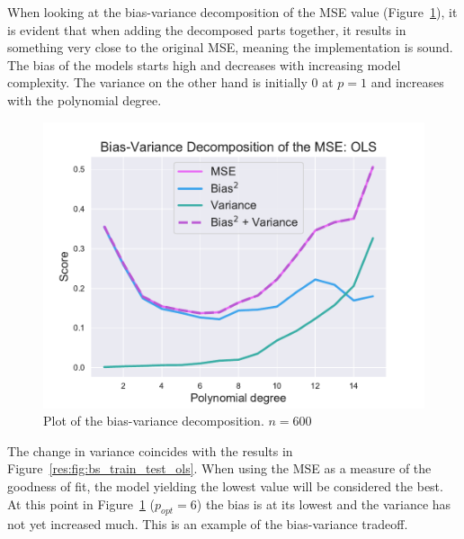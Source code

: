 \documentclass[twocolumn,english,notitlepage]{article}
\begin{document}
            When looking at the bias-variance decomposition of the MSE value (Figure~\ref{res:fig:bs_OLS_bias_variance_tradeoff_ols}), it is evident that when adding the decomposed parts together, it results in something very close to the original MSE, meaning the implementation is sound. The bias of the models starts high and decreases with increasing model complexity. The variance on the other hand is initially $0$ at $p=1$ and increases with the polynomial degree. 
            \begin{figure}[ht]
                \centering
                \includegraphics[width=.9\linewidth]{BS_Bias_var_decomp_OLS.pdf}
                \caption{Plot of the bias-variance decomposition. $n=600$ }
                \label{res:fig:bs_OLS_bias_variance_tradeoff_ols}
            \end{figure}

            The change in variance coincides with the results in Figure~\ref{res:fig:bs_train_test_ols}.
            When using the MSE as a measure of the goodness of fit, the model yielding the lowest value will be considered the best. At this point in Figure~\ref{res:fig:bs_OLS_bias_variance_tradeoff_ols} ($p_{opt}=6$) the bias is at its lowest and the variance has not yet increased much. This is an example of the bias-variance tradeoff.  
\end{document}
